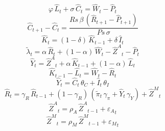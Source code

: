 \begin{dmath}
{{\varphi}}\, {{\hat{L}}}_{t}+{{\sigma}}\, {{\hat{C}}}_{t}={{\hat{W}}}_{t}-{{\hat{P}}}_{t}
\end{dmath}
\begin{dmath}
{{\hat{C}}}_{t+1}-{{\hat{C}}}_{t}=\frac{{Rs}\, {{\beta}}\, \left({{\hat{R}}}_{t+1}-{{\hat{P}}}_{t+1}\right)}{{Ps}\, {{\sigma}}}
\end{dmath}
\begin{dmath}
{{\hat{K}}}_{t}=\left(1-{{\delta}}\right)\, {{\hat{K}}}_{t-1}+{{\delta}}\, {{\hat{I}}}_{t}
\end{dmath}
\begin{dmath}
{{\tilde{\lambda}}}_{t}={{\alpha}}\, {{\hat{R}}}_{t}+\left(1-{{\alpha}}\right)\, {{\hat{W}}}_{t}-{{\hat{Z}^A}}_{t}-{{\hat{P}}}_{t}
\end{dmath}
\begin{dmath}
{{\hat{Y}}}_{t}={{\hat{Z}^A}}_{t}+{{\alpha}}\, {{\hat{K}}}_{t-1}+\left(1-{{\alpha}}\right)\, {{\hat{L}}}_{t}
\end{dmath}
\begin{dmath}
{{\hat{K}}}_{t-1}-{{\hat{L}}}_{t}={{\hat{W}}}_{t}-{{\hat{R}}}_{t}
\end{dmath}
\begin{dmath}
{{\hat{Y}}}_{t}={{\hat{C}}}_{t}\, {{\theta_C}}+{{\hat{I}}}_{t}\, {{\theta_I}}
\end{dmath}
\begin{dmath}
{{\hat{R}}}_{t}={{\gamma_R}}\, {{\hat{R}}}_{t-1}+\left(1-{{\gamma_R}}\right)\, \left({{\tilde{\pi}}}_{t}\, {{\gamma_\pi}}+{{\hat{Y}}}_{t}\, {{\gamma_Y}}\right)+{{\hat{Z}^M}}_{t}
\end{dmath}
\begin{dmath}
{{\hat{Z}^A}}_{t}={{\rho_A}}\, {{\hat{Z}^A}}_{t-1}+{{\varepsilon_A}}_{t}
\end{dmath}
\begin{dmath}
{{\hat{Z}^M}}_{t}={{\rho_M}}\, {{\hat{Z}^M}}_{t-1}+{{\varepsilon_M}}_{t}
\end{dmath}
